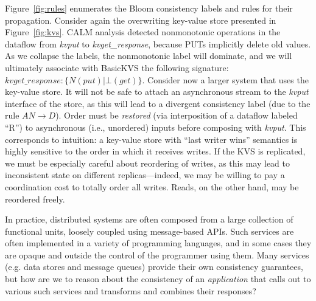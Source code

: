 Figure~\ref{fig:rules} enumerates the Bloom consistency labels and rules for their propagation.
Consider again the overwriting key-value store presented in Figure~\ref{fig:kvs}.
CALM analysis detected nonmonotonic operations in the dataflow from \emph{kvput}
to \emph{kvget\_response}, because PUTs implicitly delete old values.  As we collapse the labels,
the nonmonotonic label will dominate, and we will ultimately associate with BasicKVS the following signature:
$kvget\_response: \{N(put) | \bot(get)\}$.
Consider now a larger system that uses the key-value store.  It will not be safe to attach an asynchronous
stream to the \emph{kvput} interface of the store, as this will lead to a divergent consistency label
(due to the rule $AN \rightarrow D$).  
Order must be \emph{restored} (via
interposition of a dataflow labeled ``R'') 
to asynchronous (i.e., unordered) inputs
before composing with \emph{kvput}.  This corresponds to intuition:
a key-value store with ``last writer wins'' semantics is highly sensitive to the order in which it receives writes.
If the KVS is replicated, we must be especially careful about reordering of writes, as this
may lead to inconsistent state on different replicas---indeed, we may be willing to pay a coordination
cost to totally order all writes.
Reads, on the other hand, may be reordered freely.

In practice, distributed systems are often composed from a large 
collection of functional units, loosely coupled using message-based APIs.
Such services are often implemented in a variety of programming 
languages, and in some cases they are opaque and outside the control of
the programmer using them.  
Many services (e.g. data stores and message queues) provide their own 
consistency guarantees, but how are we to reason about the consistency of an
\emph{application} that calls out to various such services and transforms
and combines their responses?  

